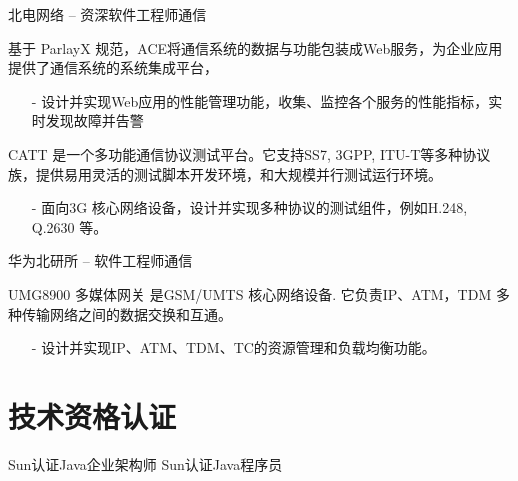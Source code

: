 \documentclass[10pt,a4paper]{moderncv}
\begin{document}
{北电网络 -- 资深软件工程师}{通信}{}{}{}
{
  基于 ParlayX 规范，ACE将通信系统的数据与功能包装成Web服务，为企业应用提供了通信系统的系统集成平台，
  \begin{itemize}
    \item[-] 设计并实现Web应用的性能管理功能，收集、监控各个服务的性能指标，实时发现故障并告警 \end{itemize}
}

\vspace*{0.2\baselineskip}
{
  CATT 是一个多功能通信协议测试平台。它支持SS7, 3GPP, ITU-T等多种协议族，提供易用灵活的测试脚本开发环境，和大规模并行测试运行环境。
  \begin{itemize}
    \item[-] 面向3G 核心网络设备，设计并实现多种协议的测试组件，例如H.248, Q.2630 等。
  \end{itemize}
}

\vspace*{0.2\baselineskip}
\vspace*{0.2\baselineskip}
\vspace*{0.4\baselineskip}

{华为北研所 -- 软件工程师}{通信}{}{}{}

{
  UMG8900 多媒体网关 是GSM/UMTS 核心网络设备. 它负责IP、ATM，TDM 多种传输网络之间的数据交换和互通。
  \begin{itemize}
    \item[-] 设计并实现IP、ATM、TDM、TC的资源管理和负载均衡功能。
  \end{itemize}
}

\vspace*{0.4\baselineskip}


\section{技术资格认证}
{Sun认证Java企业架构师 }{}{}{}{}
\vspace*{0.4\baselineskip}
{Sun认证Java程序员 }{}{}{}{}
\end{document}
